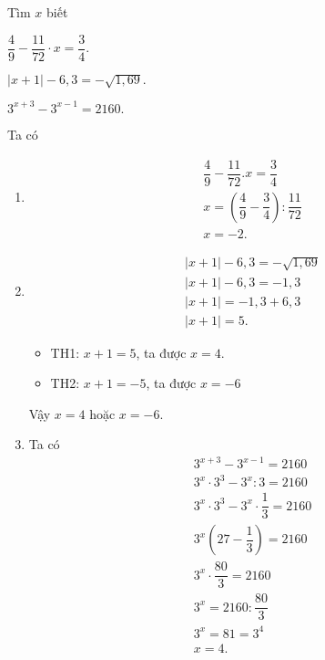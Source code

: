 		\begin{ex}%
			Tìm $x$ biết
			\begin{listEX}[2]
			\item  $\dfrac{4}{9}-\dfrac{11}{72} \cdot x=\dfrac{3}{4}.$
			\item  $|x+1|-6{,}3=-\sqrt{1{,}69}.$
			\item  $3^{x+3}-3^{x-1}=2160.$
			\end{listEX}
			\loigiai
			{
				Ta có
				
				\begin{enumerate}
					\item  
						\allowdisplaybreaks
						\begin{align*}
							&\dfrac{4}{9}-\dfrac{11}{72}.x=\dfrac{3}{4}\\
							&x = \left(\dfrac{4}{9} - \dfrac{3}{4}\right): \dfrac{11}{72}\\
							&x = -2.
						\end{align*}
					\item 
						\allowdisplaybreaks
						\begin{align*}
							&|x+1|-6{,}3=-\sqrt{1{,}69}\\
							&|x+1|-6{,}3=-1{,}3\\
							&|x+1|=-1{,}3+6{,}3\\
							&|x+1|=5.
						\end{align*}
						\begin{itemize}
							\item TH1: $x+1=5$, ta được $x = 4$.
							\item TH2: $x + 1 = -5$, ta được $x = -6$
						\end{itemize}
						Vậy $x = 4$ hoặc $x = -6$.
					\item Ta có
						\allowdisplaybreaks
						\begin{align*}
							&3^{x+3}-3^{x-1}=2160\\
							&3^x \cdot 3^3 - 3^x : 3 = 2160\\
							&3^x \cdot 3^3 - 3^x \cdot \dfrac{1}{3} = 2160\\
							&3^x \left(27 - \dfrac{1}{3}\right) = 2160\\
							&3^x \cdot \dfrac{80}{3} = 2160\\
							&3^x = 2160:\dfrac{80}{3}\\
							&3^x = 81 = 3^4\\
							&x = 4.
						\end{align*}
				\end{enumerate}
			}
		\end{ex}
	
